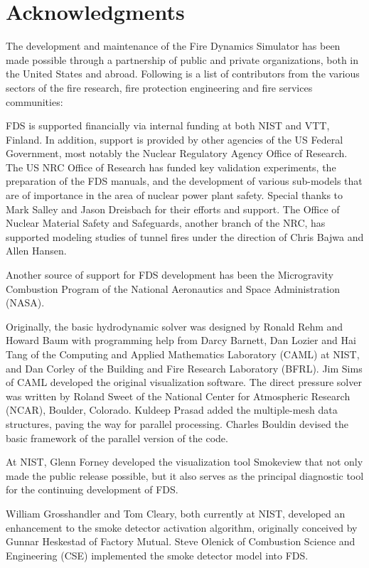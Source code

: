 \documentclass[11pt]{book}
\begin{document}
\chapter{Acknowledgments}

\label{acksection}

The development and maintenance of the Fire Dynamics Simulator has been made possible through
a partnership of public and private organizations, both in the United States and abroad. Following
is a list of contributors from the various sectors of the fire research, fire protection engineering and
fire services communities:

FDS is supported financially via internal funding at both NIST and
VTT, Finland. In addition, support is provided by other agencies of
the US Federal Government, most notably the Nuclear Regulatory Agency
Office of Research. The US NRC Office of Research has funded key
validation experiments, the preparation of the FDS manuals, and the
development of various sub-models that are of importance in the area
of nuclear power plant safety. Special thanks to Mark Salley and Jason
Dreisbach for their efforts and support.  The Office of Nuclear
Material Safety and Safeguards, another branch of the NRC, has
supported modeling studies of tunnel fires under the direction of
Chris Bajwa and Allen Hansen.

Another source of support for FDS development has been the Microgravity Combustion Program of the National Aeronautics and Space
Administration (NASA).

Originally, the basic hydrodynamic solver was designed by Ronald Rehm
and Howard Baum with programming help from Darcy Barnett, Dan Lozier
and Hai Tang of the Computing and Applied Mathematics Laboratory
(CAML) at NIST, and Dan Corley of the Building and Fire Research
Laboratory (BFRL). Jim Sims of CAML developed the original
visualization software.  The direct pressure solver was written by
Roland Sweet of the National Center for Atmospheric Research (NCAR),
Boulder, Colorado.  Kuldeep Prasad added the multiple-mesh data
structures, paving the way for parallel processing.   Charles Bouldin
devised the basic framework of the parallel version of the code.

At NIST, Glenn Forney developed the visualization tool Smokeview that
not only made the public release possible, but it also serves as the
principal diagnostic tool for the continuing development of
FDS.

William Grosshandler and Tom Cleary, both currently at NIST, developed
an enhancement to the smoke detector activation algorithm, originally
conceived by Gunnar Heskestad of Factory Mutual. Steve
Olenick of Combustion Science and Engineering (CSE) implemented the
smoke detector model into FDS.
\end{document}
